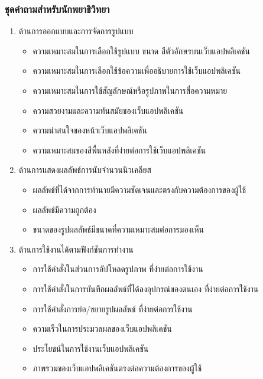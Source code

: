 \documentclass[12pt,oneside,openright,a4paper]{cpe-thai-project}
\begin{document}
\subsubsection{ชุดคำถามสำหรับนักพยาธิวิทยา}
\begin{enumerate}
    \item ด้านการออกแบบและการจัดการรูปแบบ
    \begin{itemize}

        \item    ความเหมาะสมในการเลือกใช้รูปแบบ ขนาด สีตัวอักษรบนเว็บแอปพลิเคชัน
        \item    ความเหมาะสมในการเลือกใช้ข้อความเพื่ออธิบายการใช้เว็บแอปพลิเคชัน
        \item    ความเหมาะสมในการใช้สัญลักษณ์หรือรูปภาพในการสื่อความหมาย
        \item    ความสวยงามและความทันสมัยของเว็บแอปพลิเคชัน
        \item    ความน่าสนใจของหน้าเว็บแอปพลิเคชัน
        \item    ความเหมาะสมของสีพื้นหลังที่ง่ายต่อการใช้เว็บแอปพลิเคชัน 
    \end{itemize}
    \item ด้านการแสดงผลลัพธ์การนับจำนวนนิวเคลียส
    \begin{itemize}
        \item    ผลลัพธ์ที่ได้จากการทำนายมีความชัดเจนและตรงกับความต้องการของผู้ใช้
        \item    ผลลัพธ์มีความถูกต้อง
        \item    ขนาดของรูปผลลัพธ์มีขนาดที่ความเหมาะสมต่อการมองเห็น
    \end{itemize}
    \item ด้านการใช้งานได้ตามฟังก์ชันการทำงาน
    \begin{itemize}
        \item    การใช้คำสั่งในส่วนการอัปโหลดรูปภาพ ที่ง่ายต่อการใช้งาน
        \item    การใช้คำสั่งในการบันทึกผลลัพธ์ที่ได้ลงอุปกรณ์ของตนเอง ที่ง่ายต่อการใช้งาน
        \item    การใช้คำสั่งการย่อ/ขยายรูปผลลัพธ์ ที่ง่ายต่อการใช้งาน
        \item    ความเร็วในการประมวลผลของเว็บแอปพลิเคชัน
        \item    ประโยชน์ในการใช้งานเว็บแอปพลิเคชัน
        \item    ภาพรวมของเว็บแอปพลิเคชันตรงต่อความต้องการของผู้ใช้
    \end{itemize}
\end{enumerate}
\end{document}
